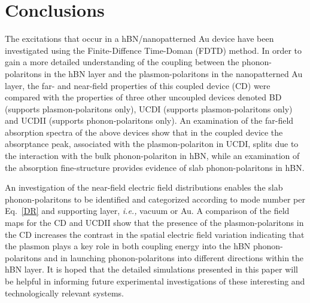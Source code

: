 \documentclass[preprint,
amsmath,amssymb,
aip,
jap,
floatfix,]{revtex4-2}
\begin{document}
		\section{Conclusions}
		\label{sec:Con}

			The excitations that occur in a hBN/nanopatterned Au device have been investigated using the Finite-Diffence Time-Doman (FDTD) method. In order to gain a more detailed understanding of the coupling between the phonon-polaritons in the hBN layer and the plasmon-polaritons in the nanopatterned Au layer, the far- and near-field properties of this coupled device (CD) were compared with the properties of three other uncoupled devices denoted BD (supports plasmon-polaritons only), UCDI (supports plasmon-polaritons only) and UCDII (supports phonon-polaritons only). An examination of the far-field absorption spectra of the above devices show that in the coupled device the absorptance peak, associated with the plasmon-polariton in UCDI, splits due to the interaction with the bulk phonon-polariton in hBN, while an examination of the absorption fine-structure provides evidence of slab phonon-polaritons in hBN.

			An investigation of the near-field electric field distributions enables the slab phonon-polaritons to be identified and categorized according to mode number per Eq.~\ref{DR} and supporting layer, \textit{i.e.,} vacuum or Au. A comparison of the field maps for the CD and UCDII show that the presence of the plasmon-polaritons in the CD increases the contrast in the spatial electric field variation indicating that the plasmon plays a key role in both coupling energy into the hBN phonon-polaritons and in launching phonon-polaritons into different directions within the hBN layer. It is hoped that the detailed simulations presented in this paper will be helpful in informing future experimental investigations of these interesting and technologically relevant systems.


\end{document}
